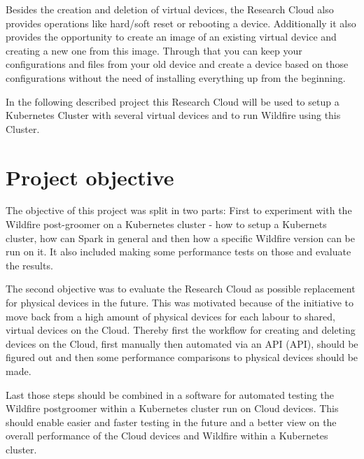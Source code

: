 
Besides the creation and deletion of virtual devices, the Research Cloud also provides operations like hard/soft reset or rebooting a device. Additionally it also provides the opportunity to create an image of an existing virtual device and creating a new one from this image. Through that you can keep your configurations and files from your old device and create a device based on those configurations without the need of installing everything up from the beginning.

In the following described project this Research Cloud will be used to setup a Kubernetes Cluster with several virtual devices and to run Wildfire using this Cluster.

\section{Project objective}

The objective of this project was split in two parts: First to experiment with the Wildfire post-groomer on a Kubernetes cluster - how to setup a Kubernets cluster, how can Spark in general and then how a specific Wildfire version can be run on it. It also included making some performance tests on those and evaluate the results. 

The second objective was to evaluate the Research Cloud as possible replacement for physical devices in the future. This was motivated because of the initiative to move back from a high amount of physical devices for each labour to shared, virtual devices on the Cloud. Thereby first the workflow for creating and deleting devices on the Cloud, first manually then automated via an \acs{API} (\acl{API}), should be figured out and then some performance comparisons to physical devices should be made.

Last those steps should be combined in a software for automated testing the Wildfire postgroomer within a Kubernetes cluster run on Cloud devices. This should enable easier and faster testing in the future and a better view on the overall performance of the Cloud devices and Wildfire within a Kubernetes cluster.
